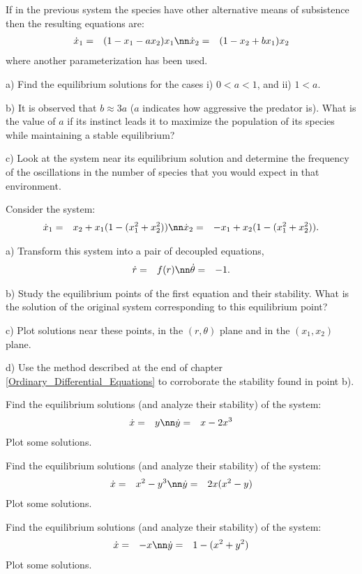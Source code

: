 \bpro
If in the previous system the species have other alternative means of
subsistence then the resulting equations are:
\begin{eqnarray}
  \label{eq:Volterra_Lotka_adim_alt}
  \dot{x}_1 &=& (1 -x_1 - ax_2)x_1 \nn
  \dot{x}_2 &=& (1 -x_2 + bx_1)x_2
\end{eqnarray}
%
where another parameterization has been used.

a) Find the equilibrium solutions for the cases i) $0< a <1$, 
and ii) $1 < a$.

b) It is observed that $b \approx 3a$ ($a$ indicates how aggressive the
predator is). What is the value of $a$ if its instinct leads it to maximize the
population of its species while maintaining a stable equilibrium?

c) Look at the system near its equilibrium solution and determine the
frequency of the oscillations in the number of species that you would expect
in that environment.
\epro

Consider the system:
\begin{eqnarray}
  \label{eq:Ciclo_Limite_Prob}
  \dot{x}_1 &=& x_2 + x_1(1-(x_1^2+x_2^2)) \nn
  \dot{x}_2 &=& -x_1 + x_2(1-(x_1^2+x_2^2)).
\end{eqnarray}
%

a) Transform this system into a pair of decoupled equations,
\begin{eqnarray}
  \label{eq:Ciclo_Limite_Prob_des}
  \dot{r} &=&  f(r) \nn
  \dot{\theta} &=& -1.
\end{eqnarray}
%

b) Study the equilibrium points of the first equation and their stability.
What is the solution of the original system corresponding to this equilibrium point?

c) Plot solutions near these points, in the $(r,\theta)$ plane and in the
$(x_1,x_2)$ plane.

d) Use the method described at the end of chapter 
\ref{Ordinary_Differential_Equations} to corroborate the stability 
found in point b).
\epro

\bpro[Verhulst]
Find the equilibrium solutions (and analyze their stability) of the system:
\begin{eqnarray}
  \dot{x} &=& y \nn
  \dot{y} &=& x-2x^3 
\end{eqnarray}
Plot some solutions.
\epro

\bpro[Verhulst]
Find the equilibrium solutions (and analyze their stability) of the system:
\begin{eqnarray}
  \dot{x} &=& x^2 - y^3 \nn
  \dot{y} &=& 2x(x^2-y) 
\end{eqnarray}
Plot some solutions.
\epro

\bpro[Verhulst]
Find the equilibrium solutions (and analyze their stability) of the system:
\begin{eqnarray}
  \dot{x} &=& -x \nn
  \dot{y} &=& 1 - (x^2+y^2) 
\end{eqnarray}
Plot some solutions.
\epro



